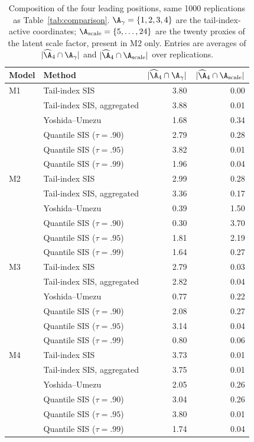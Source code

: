 \begin{table}[t]
\centering
\caption{Composition of the four leading positions, same 1000 replications as Table~\ref{tab:comparison}. $\A_\gamma=\{1,2,3,4\}$ are the tail-index-active coordinates; $\A_{\rm scale}=\{5,\ldots,24\}$ are the twenty proxies of the latent scale factor, present in M2 only. Entries are averages of $|\widehat\A_4\cap\A_\gamma|$ and $|\widehat\A_4\cap\A_{\rm scale}|$ over replications.}
\label{tab:composition}
\begin{tabular}{llrr}
\toprule
Model & Method & $|\widehat\A_4\cap\A_\gamma|$ & $|\widehat\A_4\cap\A_{\rm scale}|$\\
\midrule
M1 & Tail-index SIS & 3.80 & 0.00\\
 & Tail-index SIS, aggregated & 3.88 & 0.01\\
 & Yoshida--Umezu & 1.68 & 0.34\\
 & Quantile SIS ($\tau=.90$) & 2.79 & 0.28\\
 & Quantile SIS ($\tau=.95$) & 3.82 & 0.01\\
 & Quantile SIS ($\tau=.99$) & 1.96 & 0.04\\
\addlinespace
M2 & Tail-index SIS & 2.99 & 0.28\\
 & Tail-index SIS, aggregated & 3.36 & 0.17\\
 & Yoshida--Umezu & 0.39 & 1.50\\
 & Quantile SIS ($\tau=.90$) & 0.30 & 3.70\\
 & Quantile SIS ($\tau=.95$) & 1.81 & 2.19\\
 & Quantile SIS ($\tau=.99$) & 1.64 & 0.27\\
\addlinespace
M3 & Tail-index SIS & 2.79 & 0.03\\
 & Tail-index SIS, aggregated & 2.82 & 0.04\\
 & Yoshida--Umezu & 0.77 & 0.22\\
 & Quantile SIS ($\tau=.90$) & 2.08 & 0.27\\
 & Quantile SIS ($\tau=.95$) & 3.14 & 0.04\\
 & Quantile SIS ($\tau=.99$) & 0.80 & 0.06\\
\addlinespace
M4 & Tail-index SIS & 3.73 & 0.01\\
 & Tail-index SIS, aggregated & 3.75 & 0.01\\
 & Yoshida--Umezu & 2.05 & 0.26\\
 & Quantile SIS ($\tau=.90$) & 3.04 & 0.26\\
 & Quantile SIS ($\tau=.95$) & 3.80 & 0.01\\
 & Quantile SIS ($\tau=.99$) & 1.74 & 0.04\\
\bottomrule
\end{tabular}
\end{table}
